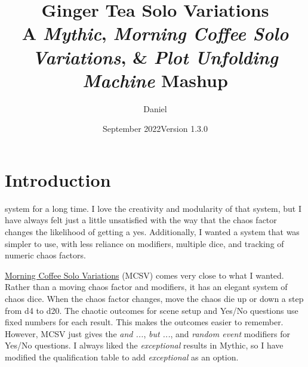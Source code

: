 

\title{
\Huge{Ginger Tea Solo Variations}
\\ \small{A \emph{Mythic}, \emph{Morning Coffee Solo Variations}, \& \emph{Plot Unfolding Machine} Mashup}
}
\date{September 2022\newline{}Version 1.3.0}
\author{Daniel}


\frontmatter
\maketitle


\mainmatter

\section{Introduction}
system for a long time. I love the creativity and modularity of that system,
but I have always felt just a little unsatisfied with the way that the chaos
factor changes the likelihood of getting a yes. Additionally, I wanted a system
that was simpler to use, with less reliance on modifiers, multiple dice, and
tracking of numeric chaos factors.

\href{https://aleaiactandaest.blogspot.com/p/downloads.html}{Morning Coffee Solo
Variations} (MCSV) comes very close to what I wanted. Rather than a moving chaos
factor and modifiers, it has an elegant system of chaos dice. When the chaos
factor changes, move the chaos die up or down a step from d4 to d20. The chaotic
outcomes for scene setup and Yes/No questions use fixed numbers for each result.
This makes the outcomes easier to remember. However, MCSV just gives the
\emph{and ...}, \emph{but ...}, and \emph{random event} modifiers for Yes/No
questions. I always liked the \emph{exceptional} results in Mythic, so I have
modified the qualification table to add \emph{exceptional} as an option.

